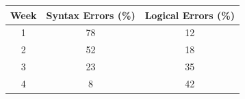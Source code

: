 \begin{table}
\centering

\begin{tabular}{@{}c c c@{}}
\toprule
\textbf{Week} & \textbf{Syntax Errors (\%)} & \textbf{Logical Errors (\%)} \\
\midrule
1 & 78 & 12 \\
2 & 52 & 18 \\
3 & 23 & 35 \\
4 & 8 & 42 \\
\bottomrule
\end{tabular}

\end{table}